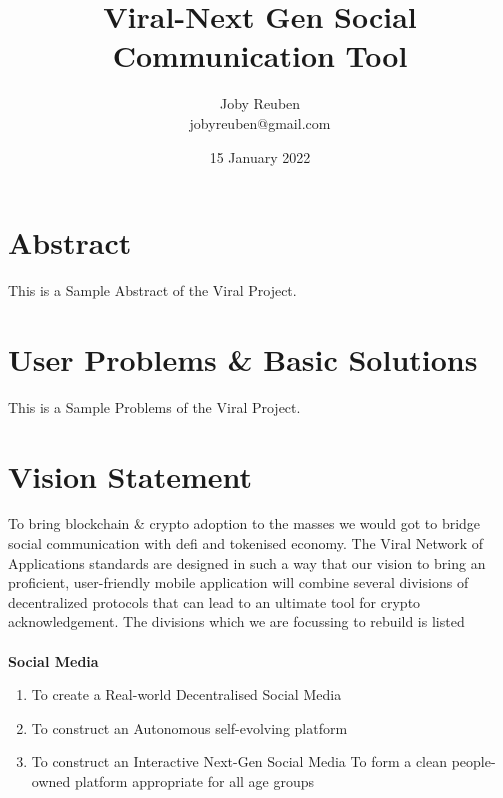 \documentclass[10pt]{article}
\title{Viral-Next Gen Social Communication Tool}
\date{15 January 2022}
\author{Joby Reuben\\jobyreuben@gmail.com}
\begin{document}
\maketitle

\section{Abstract}
This is a Sample Abstract of the Viral Project.

\section{User Problems \& Basic Solutions}
This is a Sample Problems of the Viral Project.

\section{Vision Statement}
To bring blockchain \& crypto adoption to the masses we would got to bridge social communication with defi and tokenised economy. The Viral Network of Applications standards are designed in such a way that our vision to bring an proficient, user-friendly mobile application will combine several divisions of decentralized protocols that can lead to an ultimate tool for crypto acknowledgement. The divisions which we are focussing to rebuild is listed\\
\\
\textbf{\large Social Media}
\begin{enumerate}
\item To create a Real-world Decentralised Social Media
\item To construct an Autonomous self-evolving platform
\item To construct an Interactive Next-Gen Social Media
To form a clean people-owned platform appropriate for all age groups
\end{enumerate}
\end{document}
